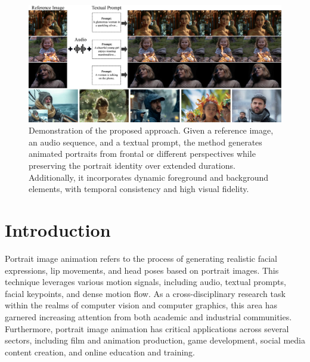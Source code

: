 \begin{figure}
    \centering
    \includegraphics[width=1\linewidth]{figs/teaser.jpg}
    \caption{Demonstration of the proposed approach. Given a reference image, an audio sequence, and a textual prompt, the method generates animated portraits from frontal or different perspectives while preserving the portrait identity over extended durations. Additionally, it incorporates dynamic foreground and background elements, with temporal consistency and high visual fidelity. }
    \label{fig:enter-label}
    \vspace{-5mm}
\end{figure}

\section{Introduction}
Portrait image animation refers to the process of generating realistic facial expressions, lip movements, and head poses based on portrait images. 
This technique leverages various motion signals, including audio, textual prompts, facial keypoints, and dense motion flow. 
As a cross-disciplinary research task within the realms of computer vision and computer graphics, this area has garnered increasing attention from both academic and industrial communities. 
Furthermore, portrait image animation has critical applications across several sectors, including film and animation production, game development, social media content creation, and online education and training.

